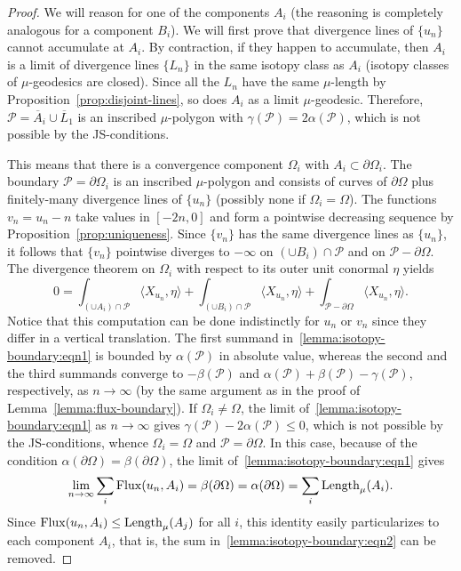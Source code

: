\documentclass[a4paper,10pt,reqno]{amsart}
\newcommand{\Length}{\mathop{\rm Length}\nolimits}
\newcommand{\Flux}{\mathrm{Flux}}
\newcommand{\sm}{-}
\theoremstyle{definition}
\theoremstyle{remark}
\numberwithin{equation}{section}
\begin{document}
\begin{proof}
We will reason for one of the components $A_i$ (the reasoning is completely analogous for a component $B_i$). We will first prove that divergence lines of $\{u_n\}$ cannot accumulate at $A_i$. By contraction, if they happen to accumulate, then $A_i$ is a limit of divergence lines $\{L_n\}$ in the same isotopy class as $A_i$ (isotopy classes of $\mu$-geodesics are closed). Since all the $L_n$ have the same $\mu$-length by Proposition~\ref{prop:disjoint-lines}, so does $A_i$ as a limit $\mu$-geodesic. Therefore, $\mathcal P=\overline A_i\cup \overline L_1$ is an inscribed $\mu$-polygon with $\gamma(\mathcal P)=2\alpha(\mathcal P)$, which is not possible by the JS-conditions.

This means that there is a convergence component $\Omega_i$ with $A_i\subset\partial\Omega_i$. The boundary $\mathcal P=\partial\Omega_i$ is an inscribed $\mu$-polygon and consists of curves of $\partial\Omega$ plus finitely-many divergence lines of $\{u_n\}$ (possibly none if $\Omega_i=\Omega$). The functions $v_n=u_n-n$ take values in $[-2n,0]$ and form a pointwise decreasing sequence by Proposition~\ref{prop:uniqueness}. Since $\{v_n\}$ has the same divergence lines as $\{u_n\}$, it follows that $\{v_n\}$ pointwise diverges to $-\infty$ on $(\cup B_i)\cap\mathcal P$ and on $\mathcal P\sm\partial\Omega$. The divergence theorem on $\Omega_i$ with respect to its outer unit conormal $\eta$ yields 
\begin{equation}\label{lemma:isotopy-boundary:eqn1}
0=\int_{(\cup A_i)\cap \mathcal P}\langle X_{u_n},\eta\rangle+\int_{(\cup B_i)\cap \mathcal P}\langle X_{u_n},\eta\rangle+\int_{\mathcal P\sm\partial\Omega}\langle X_{u_n},\eta\rangle.
\end{equation}
Notice that this computation can be done indistinctly for $u_n$ or $v_n$ since they differ in a vertical translation. The first summand in~\eqref{lemma:isotopy-boundary:eqn1} is bounded by $\alpha(\mathcal P)$ in absolute value, whereas the second and the third summands converge to $-\beta(\mathcal P)$ and $\alpha(\mathcal P)+\beta(\mathcal P)-\gamma(\mathcal P)$, respectively, as $n\to\infty$ (by the same argument as in the proof of Lemma~\ref{lemma:flux-boundary}). If $\Omega_i\neq\Omega$, the limit of~\eqref{lemma:isotopy-boundary:eqn1} as $n\to\infty$ gives $\gamma(\mathcal P)-2\alpha(\mathcal P)\leq 0$, which is not possible by the JS-conditions, whence $\Omega_i=\Omega$ and $\mathcal P=\partial\Omega$. In this case, because of the condition $\alpha(\partial\Omega)=\beta(\partial\Omega)$, the limit of~\eqref{lemma:isotopy-boundary:eqn1} gives 
\begin{equation}\label{lemma:isotopy-boundary:eqn2}
\lim_{n\to\infty}\sum_i\Flux(u_n, A_i)=\beta(\partial\Omega)=\alpha(\partial\Omega)=\sum_i\Length_\mu(A_i).
\end{equation}
Since $\Flux(u_n,A_i)\leq\Length_\mu(A_j)$ for all $i$, this identity easily particularizes to each component $A_i$, that is, the sum in~\eqref{lemma:isotopy-boundary:eqn2} can be removed.


\end{proof}
\end{document}
